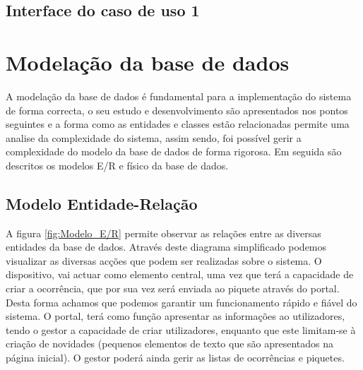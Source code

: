 \FloatBarrier\subsection{Interface do caso de uso 1}


\FloatBarrier\section{Modelação da base de dados}

A modelação da base de dados é fundamental para a implementação do sistema de forma correcta, o seu estudo e desenvolvimento são apresentados nos pontos seguintes e a forma como as entidades e classes estão relacionadas permite uma analise da complexidade do sistema, assim sendo, foi possível gerir a complexidade do modelo da base de dados de forma rigorosa. Em seguida são descritos os modelos E/R e físico da base de dados.

\FloatBarrier\subsection{Modelo Entidade-Relação}

A figura \ref{fig:Modelo_E/R} permite observar as relações entre as diversas entidades da base de dados. Através deste diagrama simplificado podemos visualizar as diversas acções que podem ser realizadas sobre o sistema.
O dispositivo, vai actuar como elemento central, uma vez que terá a capacidade de criar a ocorrência, que por sua vez será enviada ao piquete através do portal. Desta forma achamos que podemos garantir um funcionamento rápido e fiável do sistema. O portal, terá como função apresentar as informações ao utilizadores, tendo o gestor a capacidade de criar utilizadores, enquanto que este limitam-se à criação de novidades (pequenos elementos de texto que são apresentados na página inicial). O gestor poderá ainda gerir as listas de ocorrências e piquetes.

